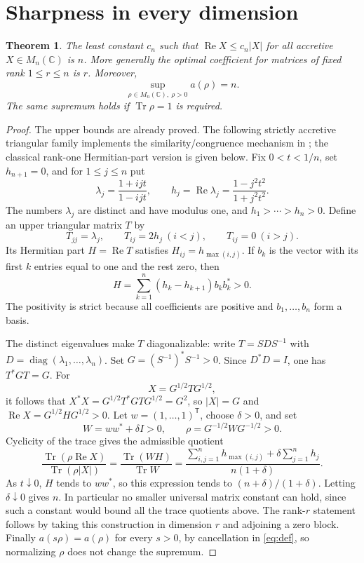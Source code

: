 \documentclass[11pt]{article}
\newcommand{\Tr}{\operatorname{Tr}}
\newcommand{\Ree}{\operatorname{Re}}
\newcommand{\C}{\mathbb C}
\newtheorem{theorem}{Theorem}
\begin{document}
\section{Sharpness in every dimension}

\begin{theorem}\label{thm:sharp}
The least constant $c_n$ such that $\Ree X\leq c_n|X|$ for all
accretive $X\in M_n(\C)$ is $n$. More generally the optimal coefficient
for matrices of fixed rank $1\leq r\leq n$ is $r$. Moreover,
\[
\sup_{\rho\in M_n(\C),\ \rho>0}a(\rho)=n.
\]
The same supremum holds if $\Tr\rho=1$ is required.
\end{theorem}
\begin{proof}
The upper bounds are already proved. The following strictly accretive
triangular family implements the similarity/congruence mechanism in
\cite[following Proposition 5.44]{ANN}; the classical rank-one
Hermitian-part version is given below. Fix $0<t<1/n$, set
$h_{n+1}=0$, and for $1\leq j\leq n$ put
\[
\lambda_j=\frac{1+ijt}{1-ijt},\qquad
h_j=\Ree\lambda_j=\frac{1-j^2t^2}{1+j^2t^2}.
\]
The numbers $\lambda_j$ are distinct and have modulus one, and
$h_1>\cdots>h_n>0$. Define an upper triangular matrix $T$ by
\[
T_{jj}=\lambda_j,\qquad T_{ij}=2h_j\ (i<j),\qquad T_{ij}=0\ (i>j).
\]
Its Hermitian part $H=\Ree T$ satisfies $H_{ij}=h_{\max(i,j)}$.
If $b_k$ is the vector with its first $k$ entries equal to one and
the rest zero, then
\begin{equation}\label{eq:gram}
H=\sum_{k=1}^n(h_k-h_{k+1})b_kb_k^*>0.
\end{equation}
The positivity is strict because all coefficients are positive and
$b_1,\ldots,b_n$ form a basis.

The distinct eigenvalues make $T$ diagonalizable: write $T=SDS^{-1}$
with $D=\operatorname{diag}(\lambda_1,\ldots,\lambda_n)$.
Set $G=(S^{-1})^*S^{-1}>0$. Since $D^*D=I$, one has $T^*GT=G$.
For
\[
X=G^{1/2}TG^{1/2},
\]
it follows that
$X^*X=G^{1/2}T^*GTG^{1/2}=G^2$,
so $|X|=G$ and $\Ree X=G^{1/2}HG^{1/2}>0$.
Let $w=(1,\ldots,1)^\mathsf{T}$, choose $\delta>0$, and set
\[
W=ww^*+\delta I>0,\qquad
\rho=G^{-1/2}WG^{-1/2}>0.
\]
Cyclicity of the trace gives the admissible quotient
\begin{equation}\label{eq:sharpquotient}
\frac{\Tr(\rho\Ree X)}{\Tr(\rho|X|)}
=\frac{\Tr(WH)}{\Tr W}
=\frac{\displaystyle\sum_{i,j=1}^n h_{\max(i,j)}
      +\delta\sum_{j=1}^n h_j}{n(1+\delta)}.
\end{equation}
As $t\downarrow0$, $H$ tends to $ww^*$, so this expression tends to
$(n+\delta)/(1+\delta)$. Letting $\delta\downarrow0$ gives $n$.
In particular no smaller universal matrix constant can hold, since
such a constant would bound all the trace quotients above.
The rank-$r$ statement follows by taking this construction in dimension
$r$ and adjoining a zero block. Finally $a(s\rho)=a(\rho)$ for every $s>0$, by cancellation in
\eqref{eq:def}, so normalizing $\rho$ does not change the supremum.
\end{proof}
\end{document}
